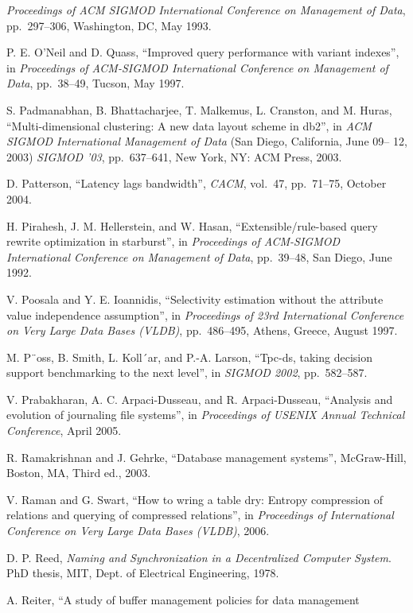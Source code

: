 \documentclass[b5paper,11pt,twoside,openright]{book}
\begin{document}
\begin{enumerate}[label={[\arabic*]}]
  \emph{Proceedings of ACM SIGMOD} \emph{International Conference on
  Management of Data}, pp.~297--306, Washington, DC, May 1993.
\item
  P. E. O'Neil and D. Quass, ``Improved query performance with variant
  indexes'', in \emph{Proceedings of ACM-SIGMOD International Conference
  on Management of} \emph{Data}, pp.~38--49, Tucson, May 1997.
\item
  S. Padmanabhan, B. Bhattacharjee, T. Malkemus, L. Cranston, and M.
  Huras, ``Multi-dimensional clustering: A new data layout scheme in
  db2'', in \emph{ACM} \emph{SIGMOD International Management of Data}
  (San Diego, California, June 09-- 12, 2003) \emph{SIGMOD '03},
  pp.~637--641, New York, NY: ACM Press, 2003.
\item
  D. Patterson, ``Latency lags bandwidth'', \emph{CACM}, vol.~47,
  pp.~71--75, October 2004.
\item
  H. Pirahesh, J. M. Hellerstein, and W. Hasan, ``Extensible/rule-based
  query rewrite optimization in starburst'', in \emph{Proceedings of
  ACM-SIGMOD International Conference on Management of Data},
  pp.~39--48, San Diego, June 1992.
\item
  V. Poosala and Y. E. Ioannidis, ``Selectivity estimation without the
  attribute value independence assumption'', in \emph{Proceedings of
  23rd International Conference on Very Large Data Bases (VLDB)},
  pp.~486--495, Athens, Greece, August 1997.
\item
  M. P¨oss, B. Smith, L. Koll´ar, and P.-A. Larson, ``Tpc-ds,
taking decision support benchmarking to the next level'', in
\emph{SIGMOD 2002}, pp.~582--587.
\item
  V. Prabakharan, A. C. Arpaci-Dusseau, and R. Arpaci-Dusseau,
``Analysis and evolution of journaling file systems'', in
\emph{Proceedings of USENIX Annual Technical Conference}, April 2005.
\item
  R. Ramakrishnan and J. Gehrke, ``Database management systems'',
  McGraw-Hill, Boston, MA, Third ed., 2003.
\item
  V. Raman and G. Swart, ``How to wring a table dry: Entropy compression
  of relations and querying of compressed relations'', in
  \emph{Proceedings of International} \emph{Conference on Very Large
  Data Bases (VLDB)}, 2006.
\item
  D. P. Reed, \emph{Naming and Synchronization in a Decentralized
  Computer System}. PhD thesis, MIT, Dept. of Electrical Engineering,
  1978.
\item
  A. Reiter, ``A study of buffer management policies for data management

\end{enumerate}
\end{document}
